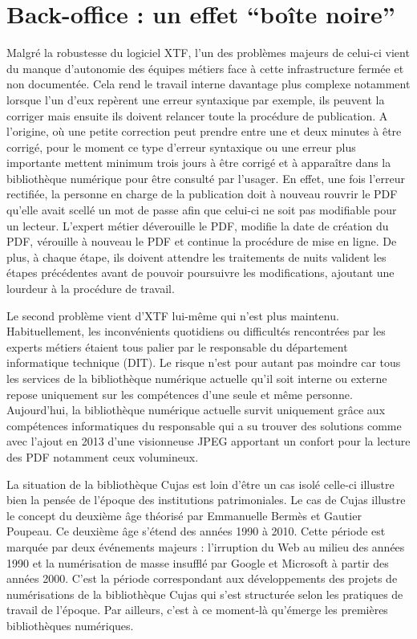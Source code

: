 \section{Back-office : un effet \enquote{boîte noire}}
Malgré la robustesse du logiciel XTF, l'un des problèmes majeurs de celui-ci vient du manque d'autonomie des équipes métiers face à cette infrastructure fermée et non documentée. Cela rend le travail interne davantage plus complexe notamment lorsque l'un d'eux repèrent une erreur syntaxique par exemple, ils peuvent la corriger mais ensuite ils doivent relancer toute la procédure de publication. A l'origine, où une petite correction peut prendre entre une et deux minutes à être corrigé, pour le moment ce type d'erreur syntaxique ou une erreur plus importante mettent minimum trois jours à être corrigé et à apparaître dans la bibliothèque numérique pour être consulté par l'usager. En effet, une fois l'erreur rectifiée, la personne en charge de la publication doit à nouveau rouvrir le PDF qu'elle avait scellé un mot de passe afin que celui-ci ne soit pas modifiable pour un lecteur. L'expert métier déverouille le PDF, modifie la date de création du PDF, vérouille à nouveau le PDF et continue la procédure de mise en ligne. De plus, à chaque étape, ils doivent attendre les traitements de nuits valident les étapes précédentes avant de pouvoir poursuivre les modifications, ajoutant une lourdeur à la procédure de travail. 

Le second problème vient d'XTF lui-même qui n'est plus maintenu. Habituellement, les inconvénients quotidiens ou difficultés rencontrées par les experts métiers étaient tous palier par le responsable du département informatique technique (DIT). Le risque n'est pour autant pas moindre car tous les services de la bibliothèque numérique actuelle qu'il soit interne ou externe repose uniquement sur les compétences d'une seule et même personne. Aujourd'hui, la bibliothèque numérique actuelle survit uniquement grâce aux compétences informatiques du responsable qui a su trouver des solutions comme avec l'ajout en 2013 d'une visionneuse JPEG apportant un confort pour la lecture  des PDF notamment ceux volumineux. 

La situation de la bibliothèque Cujas est loin d'être un cas isolé celle-ci illustre bien la pensée de l'époque des institutions patrimoniales. Le cas de Cujas illustre le concept du deuxième âge théorisé par Emmanuelle Bermès et Gautier Poupeau. Ce deuxième âge s'étend des années 1990 à 2010. Cette période est marquée par deux événements majeurs : l'irruption du Web au milieu des années 1990 et la numérisation de masse insufflé par Google et Microsoft à partir des années 2000. C'est la période correspondant aux développements des projets de numérisations de la bibliothèque Cujas qui s'est structurée selon les pratiques de travail de l'époque. Par ailleurs, c'est à ce moment-là qu'émerge les premières bibliothèques numériques. 

